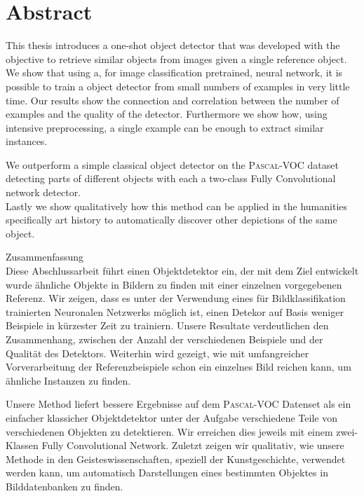 %
\chapter*{Abstract}
\label{sec:abstract}
\vspace*{-15mm}
This thesis introduces a one-shot object detector that was developed with the objective to retrieve similar objects from images given a single reference object. We show that using a, for image classification pretrained, neural network, it is possible to train a object detector from small numbers of examples in very little time. Our results show the connection and correlation between the number of examples and the quality of the detector. Furthermore we show how, using intensive preprocessing, a single example can be enough to extract similar instances.

We outperform a simple classical object detector on the \textsc{Pascal}-VOC dataset detecting parts of different objects with each a two-class Fully Convolutional network detector.\\
Lastly we show qualitatively how this method can be applied in the humanities specifically art history to automatically discover other depictions of the same object.

\vspace*{0mm}

{Zusammenfassung}\label{sec:abstract-diff} \vspace*{5mm}\\
Diese Abschlussarbeit führt einen Objektdetektor ein, der mit dem Ziel entwickelt wurde ähnliche Objekte in Bildern zu finden mit einer einzelnen vorgegebenen Referenz. Wir zeigen, dass es unter der Verwendung eines für Bildklassifikation trainierten Neuronalen Netzwerks möglich ist, einen Detekor auf Basis weniger Beispiele in kürzester Zeit zu trainiern. Unsere Resultate verdeutlichen den Zusammenhang, zwischen der Anzahl der verschiedenen Beispiele und der Qualität des Detektors. Weiterhin wird gezeigt, wie mit umfangreicher Vorverarbeitung der Referenzbeispiele schon ein einzelnes Bild reichen kann, um ähnliche Instanzen zu finden.

Unsere Method liefert bessere Ergebnisse auf dem \textsc{Pascal}-VOC Datenset als ein einfacher klassicher Objektdetektor unter der Aufgabe verschiedene Teile von verschiedenen Objekten zu detektieren. Wir erreichen dies jeweils mit einem zwei-Klassen Fully Convolutional Network.
Zuletzt zeigen wir qualitativ, wie unsere Methode in den Geisteswissenschaften, speziell der Kunstgeschichte, verwendet werden kann, um automatisch Darstellungen eines bestimmten Objektes in Bilddatenbanken zu finden.
